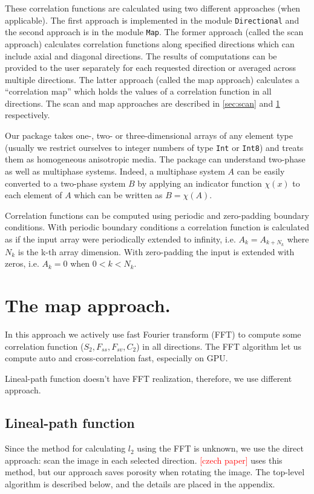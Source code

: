 \documentclass[reprint,amsmath,amssymb,aps,pre,showkeys,showpacs,nofootinbib]{revtex4-1}
\newcommand{\code}[1]{\colorbox{light-gray}{\texttt{#1}}}
\begin{document}
These correlation functions are calculated using two different approaches (when
applicable). The first approach is implemented in the module \code{Directional}
and the second approach is in the module \code{Map}. The former approach (called
the scan approach) calculates correlation functions along specified directions
which can include axial and diagonal directions. The results of computations can
be provided to the user separately for each requested direction or averaged
across multiple directions. The latter approach (called the map approach)
calculates a ``correlation map'' which holds the values of a correlation
function in all directions. The scan and map approaches are described in
\cref{sec:scan} and \cref{sec:map} respectively.

Our package takes one-, two- or three-dimensional arrays of any element type
(usually we restrict ourselves to integer numbers of type \code{Int} or
\code{Int8}) and treats them as homogeneous anisotropic media. The package can
understand two-phase as well as multiphase systems. Indeed, a multiphase system
$A$ can be easily converted to a two-phase system $B$ by applying an indicator
function $\chi(x)$ to each element of $A$ which can be written as $B = \chi(A)$.

Correlation functions can be computed using periodic and zero-padding boundary
conditions. With periodic boundary conditions a correlation function is
calculated as if the input array were periodically extended to infinity,
i.e. $A_k = A_{k+N_k}$ where $N_k$ is the k-th array dimension. With
zero-padding the input is extended with zeros, i.e. $A_k = 0$ when
$0 < k < N_k$.

\section{The map approach.}
\label{sec:map}
In this approach we actively use fast Fourier transform (FFT)
to compute some correlation function ($S_2, F_{ss}, F_{sv}, C_2$)
in all directions.
The FFT algorithm let us compute auto and cross-correlation fast,
especially on GPU.

Lineal-path function doesn't have FFT realization,
therefore, we use different approach.

\subsection{Lineal-path function}

Since the method for calculating $l_2$ using the FFT is unknown,
we use the direct approach:
scan the image in each selected direction.
\textcolor{red}{[czech paper]} uses this method,
but our approach saves porosity when rotating the image.
The top-level algorithm is described below, 
and the details are placed in the appendix.
\end{document}
